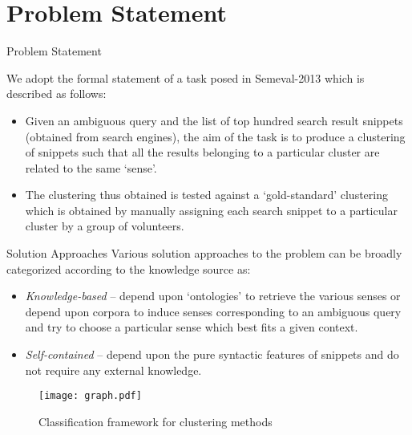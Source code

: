 \documentclass{beamer}
\begin{document}
\section{Problem Statement}
\begin{frame}{Problem Statement}

   We adopt the formal statement of a task posed in Semeval-2013 which is described as follows: 

\begin{itemize}
  \item Given an ambiguous query and the list of top hundred search
    result snippets (obtained from search engines), the aim of the task is to
    produce a clustering of snippets such that all the results
    belonging to a particular cluster are related to the same `sense'.
  \item The clustering thus obtained is tested against a
    `gold-standard' clustering which is obtained by manually assigning
    each search snippet to a particular cluster by a group of
    volunteers.
\end{itemize}
\end{frame}





\begin{frame}{Solution Approaches}
Various solution approaches to the problem can be broadly categorized according
to the knowledge source as:
\begin{itemize}
  \item {\it Knowledge-based} -- depend upon `ontologies' to retrieve
    the various senses or depend upon corpora to induce senses
    corresponding to an ambiguous query and try to choose a particular
    sense which best fits a given context.

  \item {\it Self-contained} -- depend upon the pure syntactic
    features of snippets and do not require any external knowledge.
\end{itemize}
\end{frame}
\begin{frame}%
\begin{figure}[h]
  \centering
  \texttt{[image: graph.pdf]}
  \caption{Classification framework for clustering methods}
\end{figure}
\end{frame}
\end{document}
